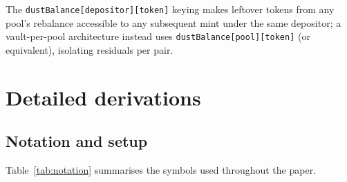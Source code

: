 \documentclass[11pt,a4paper]{article}
\theoremstyle{plain}
\begin{document}
The \texttt{dustBalance[depositor][token]} keying makes leftover tokens from any pool's rebalance accessible to any subsequent mint under the same depositor; a vault-per-pool architecture instead uses \texttt{dustBalance[pool][token]} (or equivalent), isolating residuals per pair.

\section{Detailed derivations}\label{app:dr-derivation}

\setlength{\abovedisplayskip}{10pt plus 2pt minus 2pt}
\setlength{\belowdisplayskip}{10pt plus 2pt minus 2pt}
\setlength{\abovedisplayshortskip}{8pt plus 1pt minus 1pt}
\setlength{\belowdisplayshortskip}{8pt plus 1pt minus 1pt}

\subsection{Notation and setup}

Table~\ref{tab:notation} summarises the symbols used throughout the paper.
\end{document}
